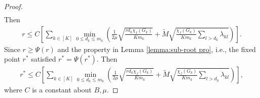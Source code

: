 \documentclass{article}
\begin{document}
\begin{proof}
\begin{align*}
\end{align*}
Then 
\begin{align*}
    r \leq C \left[ \sum_{k \in [K]} \min _{0 \leq d_k \leq m_k} \left( \frac{1}{2 \mu} \sqrt{\frac{r d_k \chi_f(G_k)}{K m_k}} +\widetilde{M} \sqrt{\frac{\chi_f(G_k)}{K m_k} \sum _{l > d_k} \lambda _{kl}} \right) \right].
\end{align*}
Since $r \geq \Psi(r)$ and
the property in Lemma \ref{lemma:sub-root pro}, i.e., the fixed point $r^*$ satisfied $r^* = \Psi(r^*)$. 
Then 
\begin{align*}
    r ^* \leq C \left[ \sum_{k \in [K]} \min _{0 \leq d_k \leq m_k} \left( \frac{1}{2 \mu} \sqrt{\frac{r d_k \chi_f(G_k)}{K m_k}} +\widetilde{M} \sqrt{\frac{\chi_f(G_k)}{K m_k} \sum _{l > d_k} \lambda _{kl}} \right) \right],
\end{align*}
where $C$ is a constant about $B, \mu$. 

\end{proof}
\end{document}
